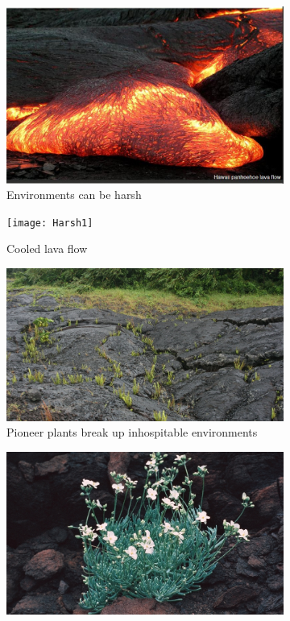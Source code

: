 \documentclass[]{article}
\begin{document}
\begin{figure}[H]
	\centering
	\caption{Living organisms alter their environments}\label{fig:Harsh}
		\begin{subfigure}[b]{0.45\textwidth}
		\centering
		\includegraphics[width=\textwidth]{Harsh0}
		\caption{Environments can be harsh}
		\label{fig:Harsh0}
	\end{subfigure}
	\hfill
	\begin{subfigure}[b]{0.45\textwidth}
		\centering
		\texttt{[image: Harsh1]}
		\caption{Cooled lava flow}
		\label{fig:Harsh1}
	\end{subfigure}
	\hfill
	\begin{subfigure}[b]{0.45\textwidth}
		\centering
		\includegraphics[width=\textwidth]{Harsh2}
		\caption{Pioneer plants break up inhospitable environments}
		\label{fig:Harsh2}
	\end{subfigure}
	\hfill
	\begin{subfigure}[b]{0.45\textwidth}
		\centering
		\includegraphics[width=\textwidth]{Harsh3}

\end{subfigure}
\end{figure}
\end{document}
